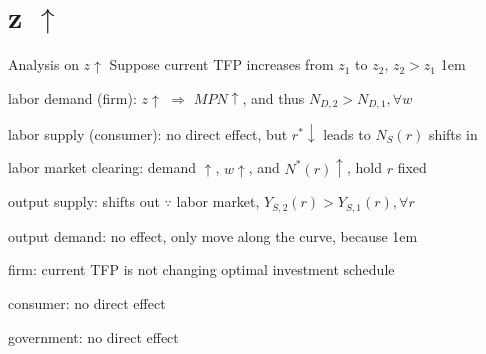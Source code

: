 \documentclass[11pt,aspectratio=43]{beamer}
\let\olditemize=\itemize
\let\endolditemize=\enditemize
\renewenvironment{itemize}{\olditemize \itemsep1em}{\endolditemize}
\theoremstyle{definition}
\begin{document}
\section{z $ \uparrow  $}
\label{sec:z____uparrow___}

\begin{frame}{Analysis on $ z \uparrow  $}
\label{slide:Analysis_on___z__uparrow___}
    Suppose \alert{current TFP} increases from $ z_{1} $ to $ z_{2} $, $ z_{2} > z_{1} $
    \begin{itemize}
        \item \alert{labor demand} (firm): $ z \uparrow  $ $ \Rightarrow  $ $ MPN \uparrow  $, and thus $ N_{D, 2} > N_{D, 1}, \forall w $
        \item \alert{labor supply} (consumer): no direct effect, but $ r^{*} \downarrow  $ leads to $ N_{S}( r )  $ shifts in
        \item \alert{labor market clearing}: demand $ \uparrow  $, $ w \uparrow  $, and $ N^{*}( r ) \uparrow $, hold $ r $ fixed
        \item \alert{output supply}: shifts out $ \because $ labor market, $ Y_{S, 2} ( r ) > Y_{S, 1}( r ), \forall r$
        \item \alert{output demand}: no effect, only move along the curve, because
        \begin{itemize}
            \item firm: current TFP is not changing optimal investment schedule
            \item consumer: no direct effect
            \item government: no direct effect
        \end{itemize}
    \end{itemize}
\end{frame}
\end{document}
